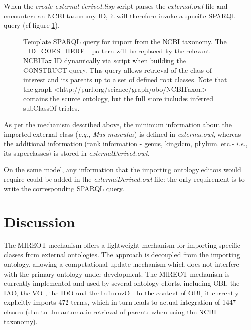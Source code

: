 \documentclass{ao2e}%
\begin{document}
When the \emph{create-external-derived.lisp} script parses the \emph{external.owl} file and encounters an NCBI taxonomy ID, it will therefore invoke a specific SPARQL query (cf figure \ref{fig:sparql2}). 

\begin{figure}[t]
\scriptsize
 
\caption{Template SPARQL query for import from the NCBI taxonomy. The \_ID\_GOES\_HERE\_ pattern will be replaced by the relevant NCBITax ID dynamically via script when building the CONSTRUCT query. This query allows retrieval of the class of interest and its parents up to a set of defined root classes. Note that the graph <http://purl.org/science/graph/obo/NCBITaxon> contains the source ontology, but the full store includes inferred subClassOf triples.}
\label{fig:sparql2}
\end{figure}
As per the mechanism described above, the minimum information about the imported external class (\emph{e.g.}, \emph{Mus musculus}) is defined in \emph{external.owl}, whereas the additional information (rank information - genus, kingdom, phylum, etc.- \emph{i.e.}, its  superclasses) is stored in \emph{ externalDerived.owl}.

On the same model, any information that the importing ontology editors would require could be added in the \emph{externalDerived.owl} file: the only requirement is to write the corresponding SPARQL query.


\section*{Discussion}

The MIREOT mechanism offers a lightweight mechanism for importing specific classes from external ontologies. The approach is decoupled from the importing ontology, allowing a computational update mechanism which does not interfere with the primary ontology under development. The \ac{MIREOT} mechanism is currently implemented and used by several ontology efforts, including \ac{OBI}, the \ac{IAO}, the \ac{VO} \cite{VO}, the \ac{IDO}\cite{IDO} and the \ac{InfluenzO} \cite{InfluenzO}.
In the context of \ac{OBI}, it currently explicitly imports 472 terms, which in turn leads to actual integration of 1447 classes (due to the automatic retrieval of parents when using the NCBI taxonomy). 
\end{document}
